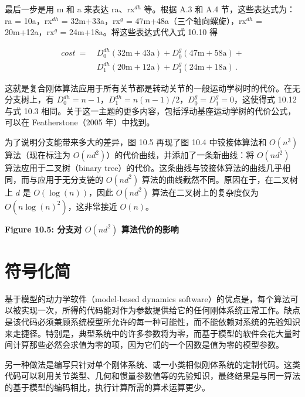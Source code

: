 \documentclass[10pt,a4paper]{book}
\theoremstyle{thmstyle} %
\theoremstyle{defstyle} %
\theoremstyle{prostyle} %
\begin{document}
最后一步是用 m 和 a 来表达 ra、rx$^{dh}$ 等。根据 A.3 和 A.4 节，这些表达式为：ra = 10a，rx$^{dh}$ = 32m+33a，rx$^{g}$ = 47m+48a（三个轴向螺旋），rx$^{dh}$ = 20m+12a，rx$^{g}$ = 24m+18a。将这些表达式代入式 10.10 得



$$
\begin{array}{rl} { c o s t \ = \ } & { D _ { 0 }^{d h} ( 32 \mathrm { m } + 43 \mathrm { a } ) + D _ { 0 }^{g} ( 47 \mathrm { m } + 58 \mathrm { a } ) + } \\& { D _ { 1 }^{d h} ( 20 \mathrm { m } + 12 \mathrm { a } ) + D _ { 1 }^{g} ( 24 \mathrm { m } + 18 \mathrm { a } ) \, . } \end{array}
$$



这就是复合刚体算法应用于所有关节都是转动关节的一般运动学树时的代价。在无分支树上，有 $D_{0}^{dh}=n-1$，$D_{1}^{dh}=n(n-1)/2$，$D_{0}^{g}=D_{1}^{g}=0$，这使得式 10.12 与式 10.3 相同。关于这一主题的更多内容，包括浮动基座运动学树的代价公式，可以在 Featherstone（2005 年）中找到。



为了说明分支能带来多大的差异，图 10.5 再现了图 10.4 中铰接体算法和 $O(n^3)$ 算法（现在标注为 $O(nd^2)$）的代价曲线，并添加了一条新曲线：将 $O(nd^2)$ 算法应用于二叉树（binary tree）的代价。这条曲线与铰接体算法的曲线几乎相同，而与应用于无分支链的 $O(nd^2)$ 算法的曲线截然不同。原因在于，在二叉树上 $d$ 是 $O(\log(n))$，因此 $O(nd^2)$ 算法在二叉树上的复杂度仅为 $O(n \log(n)^2)$，这非常接近 $O(n)$。



\noindent\textbf{Figure 10.5: 分支对 $O(nd^2)$ 算法代价的影响}





\section{符号化简}





基于模型的动力学软件（model-based dynamics software）的优点是，每个算法可以被实现一次，所得的代码能对作为参数提供给它的任何刚体系统正常工作。缺点是该代码必须兼顾系统模型所允许的每一种可能性，而不能依赖对系统的先验知识来走捷径。特别是，典型系统中的许多参数将为零，而基于模型的软件会花大量时间计算那些必然会求值为零的项，因为它们的一个因数是值为零的模型参数。



另一种做法是编写只针对单个刚体系统、或一小类相似刚体系统的定制代码。这类代码可以利用关节类型、几何和惯量参数值等的先验知识，最终结果是与同一算法的基于模型的编码相比，执行计算所需的算术运算更少。
\end{document}
